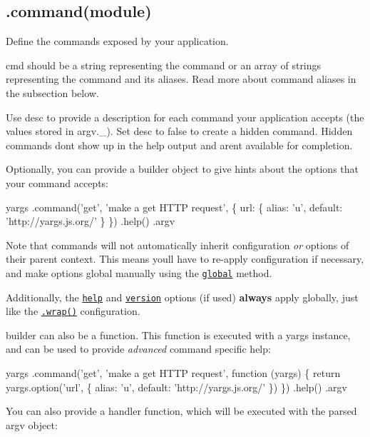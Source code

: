 \subsection*{.command(module) }

Define the commands exposed by your application.

{\ttfamily cmd} should be a string representing the command or an array of strings representing the command and its aliases. Read more about command aliases in the subsection below.

Use {\ttfamily desc} to provide a description for each command your application accepts (the values stored in {\ttfamily argv.\+\_\+}). Set {\ttfamily desc} to {\ttfamily false} to create a hidden command. Hidden commands don\textquotesingle{}t show up in the help output and aren\textquotesingle{}t available for completion.

Optionally, you can provide a {\ttfamily builder} object to give hints about the options that your command accepts\+:


\begin{DoxyCode}
yargs
  .command('get', 'make a get HTTP request', \{
    url: \{
      alias: 'u',
      default: 'http://yargs.js.org/'
    \}
  \})
  .help()
  .argv
\end{DoxyCode}


Note that commands will not automatically inherit configuration {\itshape or} options of their parent context. This means you\textquotesingle{}ll have to re-\/apply configuration if necessary, and make options global manually using the \href{#global}{\tt global} method.

Additionally, the \href{#help}{\tt {\ttfamily help}} and \href{#version}{\tt {\ttfamily version}} options (if used) {\bfseries always} apply globally, just like the \href{#wrap}{\tt {\ttfamily .wrap()}} configuration.

{\ttfamily builder} can also be a function. This function is executed with a {\ttfamily yargs} instance, and can be used to provide {\itshape advanced} command specific help\+:


\begin{DoxyCode}
yargs
  .command('get', 'make a get HTTP request', function (yargs) \{
    return yargs.option('url', \{
      alias: 'u',
      default: 'http://yargs.js.org/'
    \})
  \})
  .help()
  .argv
\end{DoxyCode}


You can also provide a handler function, which will be executed with the parsed {\ttfamily argv} object\+:


